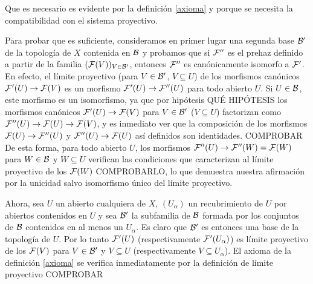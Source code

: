 \documentclass[twoside]{article}
\begin{document}
\begin{dem}
Que es necesario es evidente por la definición \ref{axioma} y porque se necesita la compatibilidad con el sistema proyectivo. %






Para probar que es suficiente, consideramos en primer lugar una segunda base ${\mathcal B}'$ de la topología de $X$ contenida en ${\mathcal B}$ y probamos que si $\mathcal{F}''$ es el prehaz definido a partir de la familia $(\mathcal{F}(V))_{V\in{\mathcal B}'}$, entonces $\mathcal{F}''$ es canónicamente isomorfo a $\mathcal{F}'$. %
En efecto, el límite proyectivo (para $V\in{\mathcal B}'$, $V\subseteq U$) de los morfismos canónicos $\mathcal{F}'(U)\to \mathcal{F}(V)$ es un morfismo $\mathcal{F}'(U)\to\mathcal{F}''(U)$ para todo abierto $U$. Si $U\in{\mathcal B}$, este morfismo es un isomorfismo, ya que por hipótesis QUÉ HIPÓTESIS los morfismos canónicos $\mathcal{F}'(U)\to\mathcal{F}(V)$ para $V\in{\mathcal B}'$ ($V\subseteq U$) factorizan como $\mathcal{F}''(U)\to\mathcal{F}(U)\to\mathcal{F}(V)$, y es inmediato ver que la composición de los morfismos $\mathcal{F}(U)\to\mathcal{F}''(U)$ y $\mathcal{F}''(U)\to\mathcal{F}(U)$ así definidos son identidades. COMPROBAR De esta forma, para todo abierto $U$, los morfismos $\mathcal{F}''(U)\to\mathcal{F}''(W)=\mathcal{F}(W)$ para $W\in{\mathcal B}$ y $W\subseteq U$ verifican las condiciones que caracterizan al límite proyectivo de los $\mathcal{F}(W)$ COMPROBARLO, lo que demuestra nuestra afirmación por la unicidad salvo isomorfismo único del límite proyectivo.

Ahora, sea $U$ un abierto cualquiera de $X$, $(U_\alpha)$ un recubrimiento de $U$ por abiertos contenidos en $U$ y sea ${\mathcal B}'$ la subfamilia de ${\mathcal B}$ formada por los conjuntos de ${\mathcal B}$ contenidos en al menos un $U_\alpha$. Es claro que ${\mathcal B}'$ es entonces una base de la topología de $U$. Por lo tanto $\mathcal{F}'(U)$ (respectivamente $\mathcal{F}'(U_\alpha)$) es límite proyectivo de los $\mathcal{F}(V)$ para $V\in{\mathcal B}'$ y $V\subseteq U$ (respectivamente $V\subseteq U_\alpha$). El axioma de la definición \ref{axioma} se verifica inmediatamente por la definición de límite proyectivo COMPROBAR


 \end{dem}
 
\end{document}
